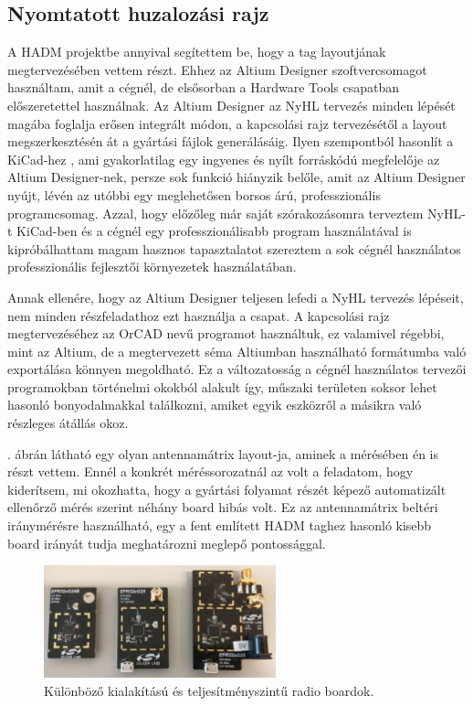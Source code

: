         \subsection{Nyomtatott huzalozási rajz}
            A HADM projektbe annyival segítettem be, hogy a tag layoutjának megtervezésében vettem részt. Ehhez az Altium Designer \cite{Altium} szoftvercsomagot használtam, amit a cégnél, de elsősorban a Hardware Tools csapatban előszeretettel használnak. Az Altium Designer az NyHL tervezés minden lépését magába foglalja erősen integrált módon, a kapcsolási rajz tervezésétől a layout megszerkesztésén át a gyártási fájlok generálásáig. Ilyen szempontból hasonlít a KiCad-hez \cite{KiCad}, ami gyakorlatilag egy ingyenes és nyílt forráskódú megfelelője az Altium Designer-nek, persze sok funkció hiányzik belőle, amit az Altium Designer nyújt, lévén az utóbbi egy meglehetősen borsos árú, professzionális programcsomag. Azzal, hogy előzőleg már saját szórakozásomra terveztem NyHL-t KiCad-ben és a cégnél egy professzionálisabb program használatával is kipróbálhattam magam hasznos tapasztalatot szereztem a sok cégnél használatos professzionális fejlesztői környezetek használatában.
            \par
            Annak ellenére, hogy az Altium Designer teljesen lefedi a NyHL tervezés lépéseit, nem minden részfeladathoz ezt használja a csapat. A kapcsolási rajz megtervezéséhez az OrCAD nevű programot használtuk, ez valamivel régebbi, mint az Altium, de a megtervezett séma Altiumban használható formátumba való exportálása könnyen megoldható. Ez a változatosság a cégnél használatos tervezői programokban történelmi okokból alakult így, műszaki területen soksor lehet hasonló bonyodalmakkal találkozni, amiket egyik eszközről a másikra való részleges átállás okoz.
            \par
            . ábrán látható egy olyan antennamátrix layout-ja, aminek a mérésében én is részt vettem. Ennél a konkrét méréssorozatnál az volt a feladatom, hogy kiderítsem, mi okozhatta, hogy a gyártási folyamat részét képező automatizált ellenőrző mérés szerint néhány board hibás volt. Ez az antennamátrix beltéri iránymérésre használható, egy a fent említett HADM taghez hasonló kisebb board irányát tudja meghatározni meglepő pontossággal.
            \par
            \begin{figure}
                \centering
                \includegraphics[width=0.6\textwidth]{kep/szerkesztett/power-levels.jpg}
                \caption{Különböző kialakítású és teljesítményszintű radio boardok.}
                \label{fig:power-levels}
            \end{figure}
